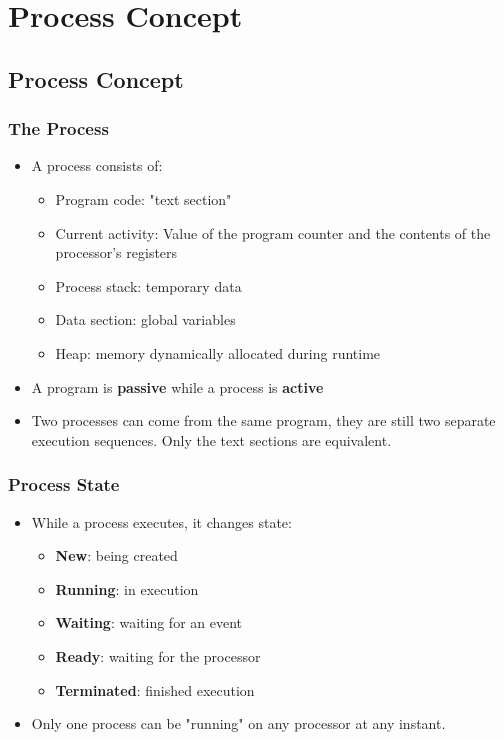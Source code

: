\documentclass[10pt]{report}
\begin{document}


\chapter{Process Concept} \label{ch:Chapter3}
	\section{Process Concept}
		\subsection{The Process}
			\begin{itemize}
				\item A process consists of:
				\begin{itemize}
					\item Program code: "text section"
					\item Current activity: Value of the program counter and the contents of the processor's registers
					\item Process stack: temporary data
					\item Data section: global variables
					\item Heap: memory dynamically allocated during runtime
				\end{itemize}
				\item A program is \textbf{passive} while a process is \textbf{active}
				\item Two processes can come from the same program, they are still two separate execution sequences. Only the text sections are equivalent.
			\end{itemize}

		\subsection{Process State}
			\begin{itemize}
				\item While a process executes, it changes state:
				\begin{itemize}
					\item \textbf{New}: being created
					\item \textbf{Running}: in execution
					\item \textbf{Waiting}: waiting for an event
					\item \textbf{Ready}: waiting for the processor
					\item \textbf{Terminated}: finished execution
				\end{itemize}
				\item Only one process can be "running" on any processor at any instant.
			\end{itemize}
\end{document}
